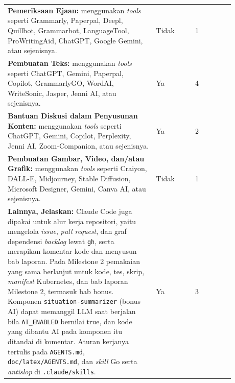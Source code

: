 {\setlength{\LTpre}{0pt}\setlength{\LTpost}{0pt}\setlength{\LTleft}{0pt}\setlength{\LTright}{0pt}\small\renewcommand{\arraystretch}{1}\setlength{\extrarowheight}{6pt}\setlength{\tabcolsep}{6pt}
\begin{longtable}[]{|>{\raggedright\arraybackslash}m{0.58\linewidth}|>{\centering\arraybackslash}m{0.15\linewidth}|>{\centering\arraybackslash}m{0.15\linewidth}|}
\hline
\multicolumn{1}{|c|}{\textbf{Lingkup Pekerjaan}} & \multicolumn{1}{c|}{\textbf{Digunakan?}} & \multicolumn{1}{c|}{\textbf{Tingkat Penggunaan}} \\[6pt]
\hline
\endhead
\rule{0pt}{12pt}\textbf{Pemeriksaan Ejaan:} menggunakan \textit{tools} seperti Grammarly, Paperpal, Deepl, Quillbot, Grammarbot, LanguageTool, ProWritingAid, ChatGPT, Google Gemini, atau sejenisnya.\rule[-8pt]{0pt}{0pt} & \rule{0pt}{12pt}Tidak\rule[-8pt]{0pt}{0pt} & \rule{0pt}{12pt}1\rule[-8pt]{0pt}{0pt} \\
\hline
\rule{0pt}{12pt}\textbf{Pembuatan Teks:} menggunakan \textit{tools} seperti ChatGPT, Gemini, Paperpal, Copilot, GrammarlyGO, WordAI, WriteSonic, Jasper, Jenni AI, atau sejenisnya.\rule[-8pt]{0pt}{0pt} & \rule{0pt}{12pt}Ya\rule[-8pt]{0pt}{0pt} & \rule{0pt}{12pt}4\rule[-8pt]{0pt}{0pt} \\
\hline
\rule{0pt}{12pt}\textbf{Bantuan Diskusi dalam Penyusunan Konten:} menggunakan \textit{tools} seperti ChatGPT, Gemini, Copilot, Perplexity, Jenni AI, Zoom-Companion, atau sejenisnya.\rule[-8pt]{0pt}{0pt} & \rule{0pt}{12pt}Ya\rule[-8pt]{0pt}{0pt} & \rule{0pt}{12pt}2\rule[-8pt]{0pt}{0pt} \\
\hline
\rule{0pt}{12pt}\textbf{Pembuatan Gambar, Video, dan/atau Grafik:} menggunakan \textit{tools} seperti Craiyon, DALL-E, Midjourney, Stable Diffusion, Microsoft Designer, Gemini, Canva AI, atau sejenisnya.\rule[-8pt]{0pt}{0pt} & \rule{0pt}{12pt}Tidak\rule[-8pt]{0pt}{0pt} & \rule{0pt}{12pt}1\rule[-8pt]{0pt}{0pt} \\
\hline
\rule{0pt}{12pt}\textbf{Lainnya, Jelaskan:} Claude Code juga dipakai untuk alur kerja repositori, yaitu mengelola \textit{issue}, \textit{pull request}, dan graf dependensi \textit{backlog} lewat \texttt{gh}, serta merapikan komentar kode dan menyusun bab laporan. Pada Milestone 2 pemakaian yang sama berlanjut untuk kode, tes, skrip, \textit{manifest} Kubernetes, dan bab laporan Milestone 2, termasuk bab bonus. Komponen \texttt{situation-summarizer} (bonus AI) dapat memanggil LLM saat berjalan bila \texttt{AI\_ENABLED} bernilai true, dan kode yang dibantu AI pada komponen itu ditandai di komentar. Aturan kerjanya tertulis pada \texttt{AGENTS.md}, \texttt{doc/latex/AGENTS.md}, dan \textit{skill} Go serta \textit{antislop} di \texttt{.claude/skills}.\rule[-8pt]{0pt}{0pt} & \rule{0pt}{12pt}Ya\rule[-8pt]{0pt}{0pt} & \rule{0pt}{12pt}3\rule[-8pt]{0pt}{0pt} \\
\hline
\end{longtable}}
\vspace{-0.2em}

